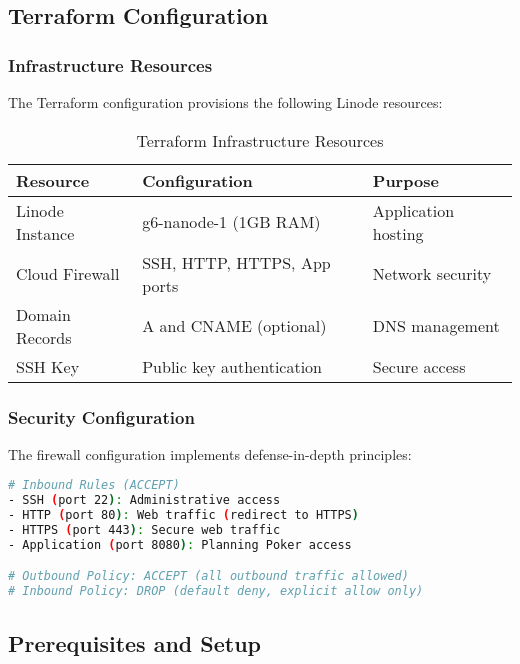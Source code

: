 \documentclass[11pt,a4paper]{article}
\begin{document}
\subsection{Terraform Configuration}

\subsubsection{Infrastructure Resources}

The Terraform configuration provisions the following Linode resources:

\begin{table}[H]
\centering
\begin{tabular}{@{}lll@{}}
\toprule
\textbf{Resource} & \textbf{Configuration} & \textbf{Purpose} \\
\midrule
Linode Instance & g6-nanode-1 (1GB RAM) & Application hosting \\
Cloud Firewall & SSH, HTTP, HTTPS, App ports & Network security \\
Domain Records & A and CNAME (optional) & DNS management \\
SSH Key & Public key authentication & Secure access \\
\bottomrule
\end{tabular}
\caption{Terraform Infrastructure Resources}
\label{tab:terraform-resources}
\end{table}

\subsubsection{Security Configuration}

The firewall configuration implements defense-in-depth principles:

\begin{lstlisting}[language=bash, caption=Firewall Rules Configuration]
# Inbound Rules (ACCEPT)
- SSH (port 22): Administrative access
- HTTP (port 80): Web traffic (redirect to HTTPS)
- HTTPS (port 443): Secure web traffic
- Application (port 8080): Planning Poker access

# Outbound Policy: ACCEPT (all outbound traffic allowed)
# Inbound Policy: DROP (default deny, explicit allow only)
\end{lstlisting}

\subsection{Prerequisites and Setup}
\end{document}
